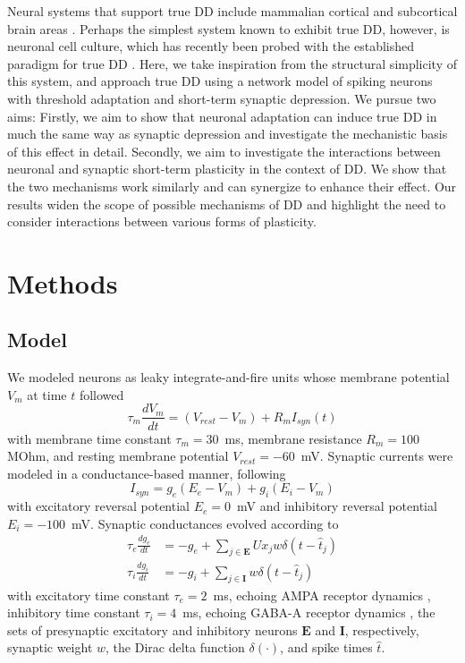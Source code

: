 \documentclass[9pt,lineno,onehalfspacing]{elife}
\begin{document}
Neural systems that support true DD include mammalian cortical and subcortical brain areas \citep{Carbajal2018-sd, Parras2017-fp, Grimm2012-tb}. Perhaps the simplest system known to exhibit true DD, however, is neuronal cell culture, which has recently been probed with the established paradigm for true DD \citep{Kubota2021-dx}. Here, we take inspiration from the structural simplicity of this system, and approach true DD using a network model of spiking neurons with threshold adaptation and short-term synaptic depression. We pursue two aims: Firstly, we aim to show that neuronal adaptation can induce true DD in much the same way as synaptic depression and investigate the mechanistic basis of this effect in detail. Secondly, we aim to investigate the interactions between neuronal and synaptic short-term plasticity in the context of DD. We show that the two mechanisms work similarly and can synergize to enhance their effect. Our results widen the scope of possible mechanisms of DD and highlight the need to consider interactions between various forms of plasticity.

\section{Methods}\label{sec:methods}

\subsection{Model}\label{sec:model}

We modeled neurons as leaky integrate-and-fire units whose membrane potential $V_m$ at time $t$ followed
\begin{equation}
    \tau_m \frac{dV_m}{dt} = (V_{rest}-V_m) + R_m I_{syn}(t)
\end{equation}
with membrane time constant $\tau_m = 30$~ms, membrane resistance $R_m = 100$ MOhm, and resting membrane potential $V_{rest} = -60$~mV. Synaptic currents were modeled in a conductance-based manner, following
\begin{equation}
    I_{syn} = g_e(E_e-V_m) + g_i(E_i-V_m)
\end{equation}
with excitatory reversal potential $E_e = 0$~mV and inhibitory reversal potential $E_i = -100$~mV. Synaptic conductances evolved according to
\begin{align} 
    \tau_e \frac{dg_e}{dt} &= -g_e + \sum_{j \in \boldsymbol E} U x_j w \delta(t - \hat{t}_j) \nonumber \\
    \tau_i \frac{dg_i}{dt} &= -g_i + \sum_{j \in \boldsymbol I} w \delta(t - \hat{t}_j) \label{eq:gsyn}
\end{align}
with excitatory time constant $\tau_e = 2$~ms, echoing AMPA receptor dynamics \citep{Hausser1997-cn}, inhibitory time constant $\tau_i = 4$~ms, echoing GABA-A receptor dynamics \citep{Destexhe1994-oc}, the sets of presynaptic excitatory and inhibitory neurons $\boldsymbol E$ and $\boldsymbol I$, respectively, synaptic weight $w$, the Dirac delta function $\delta(\cdot)$, and spike times $\hat{t}$.
\end{document}
